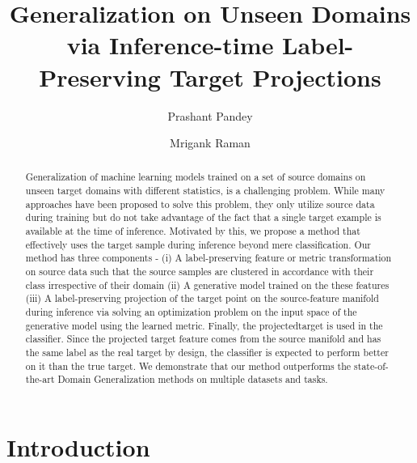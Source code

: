 \documentclass[review]{cvpr}
\title{Generalization on Unseen Domains via Inference-time Label-Preserving Target Projections}
\author{ Prashant Pandey\\
\and
Mrigank Raman\\

}
\begin{document}
\maketitle


\begin{abstract}
   Generalization of machine learning models trained on a
set of source domains on unseen target domains with different statistics, is a challenging problem. While many approaches have been proposed to solve this problem, they only utilize source data during training but do not take advantage of the fact that a single target example is available
at the time of inference. Motivated by this, we propose a
method that effectively uses the target sample during inference beyond mere classification. Our method has three components - (i) A label-preserving feature or metric transformation on source data such that the source samples are clustered in accordance with their class irrespective of their
domain (ii) A generative model trained on the these features (iii) A label-preserving projection of the target point on the source-feature manifold during inference via solving an optimization problem on the input space of the generative model using the learned metric. Finally, the projectedtarget is used in the classifier. Since the projected target feature comes from the source manifold and has the same label as the real target by design, the classifier is expected to perform better on it than the true target. We demonstrate that our method outperforms the state-of-the-art Domain Generalization methods on multiple datasets and tasks.
\end{abstract}

\section{Introduction}
\end{document}
